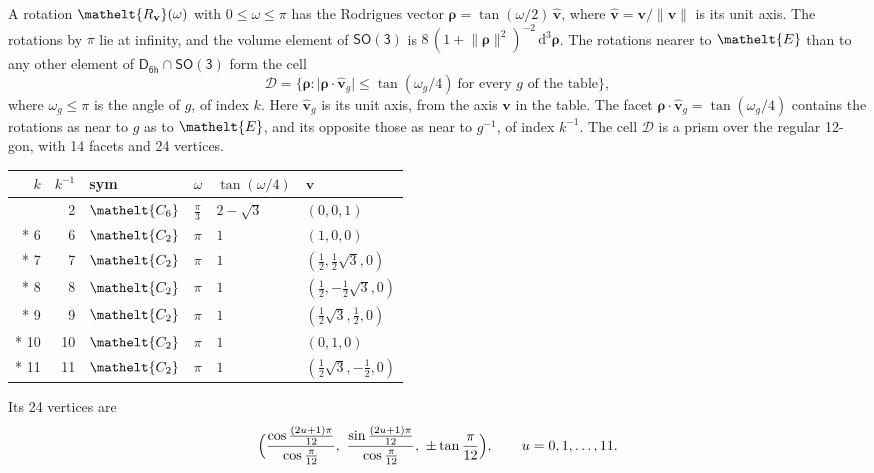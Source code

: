 \documentclass[10pt,a4paper]{article}
\numberwithin{equation}{section}
\newcommand{\eltfont}[1]{{\let\sigma\eltsigma\mathelt{#1}}}
\newcommand{\grp}[1]{\mathsf{#1}}
\newcommand{\cls}[1]{\eltfont{#1}}
\newcommand{\elt}[1]{\eltfont{#1}}
\newcommand{\dirvec}[3]{(#1, #2, #3)}
\newcommand{\unitaxis}{\hat{\mathbf{v}}}
\newcommand{\vv}{\mathbf{v}}
\newcommand{\diff}{\mathrm{d}}
\newcommand{\rodrigues}{\boldsymbol{\rho}}
\newcommand{\fcell}{\mathcal{D}}
\begin{document}
\leavevmode\label{n:vector.rodrigues}\label{n:vector.unitaxis}A rotation $\elt{R_{\vv}}(\omega)$ with $0 \le \omega \le \pi$ has the Rodrigues vector $\rodrigues = \tan(\omega/2)\,\unitaxis$, where $\unitaxis = \vv/\lVert\vv\rVert$ is its unit axis. The rotations by $\pi$ lie at infinity, and the volume element of \href{SO3.pdf}{$\grp{SO(3)}$} is $8\,(1 + \lVert\rodrigues\rVert^2)^{-2}\,\diff^3\rodrigues$.
\leavevmode\label{n:set.cell}The rotations nearer to $\elt{E}$ than to any other element of $\grp{D_{6h}} \cap \grp{SO(3)}$ form the cell
\begin{equation}\label{e:cell}\fcell = \bigl\{\rodrigues : \lvert\rodrigues\cdot\unitaxis_g\rvert \le \tan(\omega_g/4)\ \text{for every $g$ of the table}\bigr\},\end{equation}
where $\omega_g \le \pi$ is the angle of $g$, of index $k$. Here $\unitaxis_g$ is its unit axis, from the axis $\vv$ in the table. The facet $\rodrigues\cdot\unitaxis_g = \tan(\omega_g/4)$ contains the rotations as near to $g$ as to $\elt{E}$, and its opposite those as near to $g^{-1}$, of index $k^{-1}$. The cell $\fcell$ is a prism over the regular 12-gon, with 14 facets and 24 vertices.
{\small{\renewcommand{\arraystretch}{1.3}\begin{longtable}{@{}rrllll@{}}\toprule
$k$ & $k^{-1}$ & sym & $\omega$ & $\tan(\omega/4)$ & $\vv$\\\midrule\endhead
\bottomrule\endfoot\endlastfoot
1 & 2 & $\cls{C_{6}}$ & $\tfrac{\pi}{3}$ & $2 - \sqrt{3}$ & $\dirvec{0}{0}{1}$\\*
6 & 6 & $\cls{C_{2}}$ & $\pi$ & $1$ & $\dirvec{1}{0}{0}$\\*
7 & 7 & $\cls{C_{2}}$ & $\pi$ & $1$ & $\dirvec{\tfrac{1}{2}}{\tfrac{1}{2}\sqrt{3}}{0}$\\*
8 & 8 & $\cls{C_{2}}$ & $\pi$ & $1$ & $\dirvec{\tfrac{1}{2}}{-\tfrac{1}{2}\sqrt{3}}{0}$\\*
9 & 9 & $\cls{C_{2}}$ & $\pi$ & $1$ & $\dirvec{\tfrac{1}{2}\sqrt{3}}{\tfrac{1}{2}}{0}$\\*
10 & 10 & $\cls{C_{2}}$ & $\pi$ & $1$ & $\dirvec{0}{1}{0}$\\*
11 & 11 & $\cls{C_{2}}$ & $\pi$ & $1$ & $\dirvec{\tfrac{1}{2}\sqrt{3}}{-\tfrac{1}{2}}{0}$\\
\bottomrule\end{longtable}}}
\leavevmode\label{n:local.vertex.u}Its 24 vertices are
\begin{equation}\label{e:prism}\Bigl(\frac{\cos\frac{(2u+1)\pi}{12}}{\cos\frac{\pi}{12}},\ \frac{\sin\frac{(2u+1)\pi}{12}}{\cos\frac{\pi}{12}},\ \pm\tan\frac{\pi}{12}\Bigr),\qquad u = 0, 1, \dots, 11.\end{equation}
\end{document}
